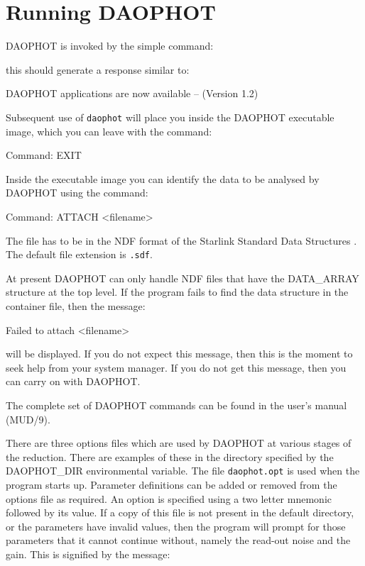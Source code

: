 \documentclass[11pt,nolof]{starlink}
\begin{document}
\section{Running DAOPHOT}

\label{sec:running}

DAOPHOT is invoked by the simple command:

\begin{terminalv}
\end{terminalv}

this should generate a response similar to:

\begin{terminalv}
DAOPHOT applications are now available -- (Version 1.2)
\end{terminalv}

Subsequent use of \texttt{daophot} will place you inside the DAOPHOT executable image,
which you can leave with the command:

\begin{terminalv}
Command: EXIT
\end{terminalv}

Inside the executable image you can identify the data to be analysed by DAOPHOT
using the command:

\begin{terminalv}
Command: ATTACH <filename>
\end{terminalv}

The file has to be in the NDF format of the Starlink Standard Data Structures
. The default file extension is \texttt{.sdf}.

At present DAOPHOT can only handle NDF files that have the DATA\_ARRAY structure at
the top level. If the program fails to find the data structure in the container
file, then the message:

\begin{terminalv}
Failed to attach <filename>
\end{terminalv}

will be displayed. If you do not expect this message, then this is the moment to
seek help from your system manager. If you do not get this message, then you can
carry on with DAOPHOT.

The complete set of DAOPHOT commands can be found in the user's manual (MUD/9).

There are three options files which are used by DAOPHOT at various stages of the
reduction. There are examples of these in the directory specified by the
DAOPHOT\_DIR environmental variable. The file \texttt{daophot.opt} is used when the
program starts up. Parameter definitions can be added or removed from the options
file as required. An option is specified using a two letter mnemonic followed by
its value. If a copy of this file is not present in the default directory, or the
parameters have invalid values, then the program will prompt for those parameters
that it cannot continue without, namely the read-out noise and the gain. This is
signified by the message:
\end{document}
